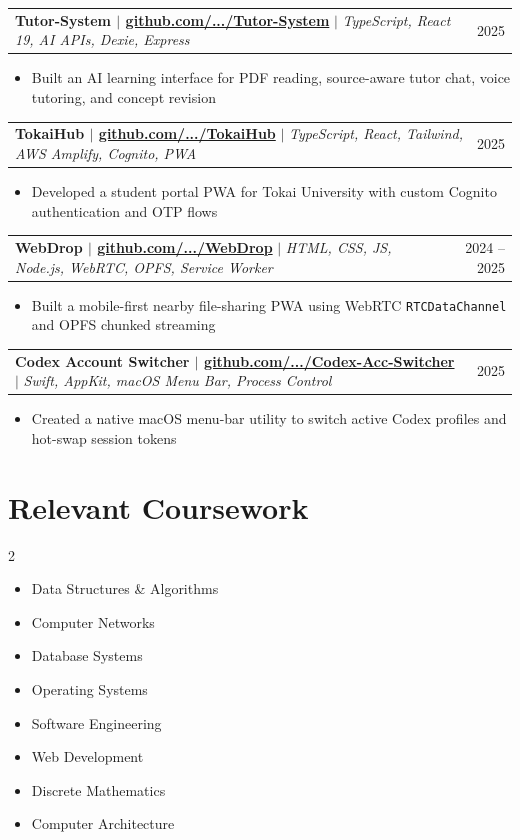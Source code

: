 \documentclass[9.5pt, a4paper]{article}
\makeatletter
\newcommand{\projheading}[3]{%
  \vspace{1.5pt}
  \begin{tabularx}{\linewidth}{@{}Xr@{}}
    \small\textbf{\color{darkgray}#1} $|$ \textcolor{medgray}{\small\textit{#2}} & \textcolor{medgray}{\small #3}\\
  \end{tabularx}
  \vspace{-1.5pt}
}
\newenvironment{bulletlist}{%
  \begin{itemize}[leftmargin=1.1em, itemsep=0.2pt, topsep=0.5pt, parsep=0pt]
  \small\color{darkgray}
}{%
  \end{itemize}\vspace{1.5pt}
}
\makeatother
\begin{document}
\begin{minipage}[t]{0.69\linewidth}
\projheading{Tutor-System $|$ \small\color{medgray}\href{https://github.com/MohamedFuad16/Tutor-System}{github.com/.../Tutor-System}}{TypeScript, React 19, AI APIs, Dexie, Express}{2025}
\begin{bulletlist}
  \item Built an AI learning interface for PDF reading, source-aware tutor chat, voice tutoring, and concept revision
\end{bulletlist}

\projheading{TokaiHub $|$ \small\color{medgray}\href{https://github.com/MohamedFuad16/TokaiHub}{github.com/.../TokaiHub}}{TypeScript, React, Tailwind, AWS Amplify, Cognito, PWA}{2025}
\begin{bulletlist}
  \item Developed a student portal PWA for Tokai University with custom Cognito authentication and OTP flows
\end{bulletlist}

\projheading{WebDrop $|$ \small\color{medgray}\href{https://github.com/MohamedFuad16/WebDrop}{github.com/.../WebDrop}}{HTML, CSS, JS, Node.js, WebRTC, OPFS, Service Worker}{2024 -- 2025}
\begin{bulletlist}
  \item Built a mobile-first nearby file-sharing PWA using WebRTC \texttt{RTCDataChannel} and OPFS chunked streaming
\end{bulletlist}

\projheading{Codex Account Switcher $|$ \small\color{medgray}\href{https://github.com/MohamedFuad16/Codex-Acc-Switcher}{github.com/.../Codex-Acc-Switcher}}{Swift, AppKit, macOS Menu Bar, Process Control}{2025}
\begin{bulletlist}
  \item Created a native macOS menu-bar utility to switch active Codex profiles and hot-swap session tokens
\end{bulletlist}

\section{Relevant Coursework}

\begin{multicols}{2}
\begin{itemize}[leftmargin=1em, itemsep=0.5pt, topsep=1pt]
  \small\color{darkgray}
  \item Data Structures \& Algorithms
  \item Computer Networks
  \item Database Systems
  \item Operating Systems
  \item Software Engineering
  \item Web Development
  \item Discrete Mathematics
  \item Computer Architecture
\end{itemize}
\end{multicols}


\end{minipage}
\end{document}
